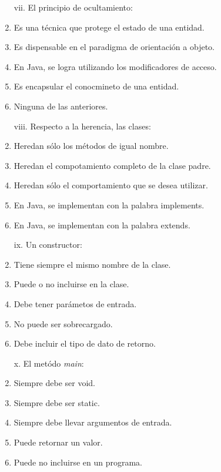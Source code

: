 \documentclass[10pt]{article}
\begin{document}
{\begin{enumerate}
\begin{multicols}{2}
    \begin{enumerate}[label=(\alph*)]
        \item[vii.] El principio de ocultamiento: 
        \item Es una t\'ecnica que protege el estado de una entidad.
        \item Es dispensable en el paradigma de orientaci\'on a objeto.
        \item En Java, se logra utilizando los modificadores de acceso.
        \item Es encapsular el conocmineto de una entidad.
        \item Ninguna de las anteriores.
    \end{enumerate}

    \begin{enumerate}[label=(\alph*)]
        \item[viii.] Respecto a la herencia, las clases:
        \item Heredan s\'olo los m\'etodos de igual nombre.
        \item Heredan el compotamiento completo de la clase padre.
        \item Heredan s\'olo el comportamiento que se desea utilizar.
        \item En Java, se implementan con la palabra implements.
        \item En Java, se implementan con la palabra extends.
    \end{enumerate}

    \begin{enumerate}[label=(\alph*)]
        \item[ix.] Un constructor: 
        \item Tiene siempre el mismo nombre de la clase.
        \item Puede o no incluirse en la clase.
        \item Debe tener par\'ametos de entrada.
        \item No puede ser sobrecargado.
        \item Debe incluir el tipo de dato de retorno.
    \end{enumerate}

    \begin{enumerate}[label=(\alph*)]
        \item[x.] El met\'odo \emph{main}:
        \item Siempre debe ser void.
        \item Siempre debe ser static.
        \item Siempre debe llevar argumentos de entrada.
        \item Puede retornar un valor.
        \item Puede no incluirse en un programa.
    \end{enumerate}


\end{multicols}
\end{enumerate}}
\end{document}
